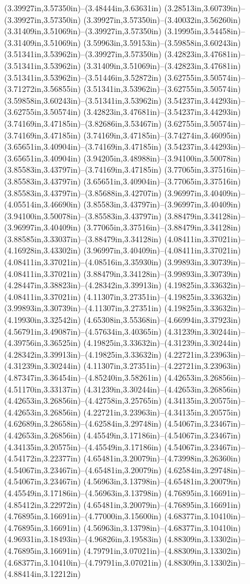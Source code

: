 (3.39927in,3.57350in)--(3.48444in,3.63631in) (3.28513in,3.60739in)--(3.39927in,3.57350in) (3.39927in,3.57350in)--(3.40032in,3.56260in) (3.31409in,3.51069in)--(3.39927in,3.57350in) (3.19995in,3.54458in)--(3.31409in,3.51069in) (3.59963in,3.59153in)--(3.59858in,3.60243in) (3.51341in,3.53962in)--(3.39927in,3.57350in) (3.42823in,3.47681in)--(3.51341in,3.53962in) (3.31409in,3.51069in)--(3.42823in,3.47681in) (3.51341in,3.53962in)--(3.51446in,3.52872in) (3.62755in,3.50574in)--(3.71272in,3.56855in) (3.51341in,3.53962in)--(3.62755in,3.50574in) (3.59858in,3.60243in)--(3.51341in,3.53962in) (3.54237in,3.44293in)--(3.62755in,3.50574in) (3.42823in,3.47681in)--(3.54237in,3.44293in) (3.74169in,3.47185in)--(3.82686in,3.53467in) (3.62755in,3.50574in)--(3.74169in,3.47185in) (3.74169in,3.47185in)--(3.74274in,3.46095in) (3.65651in,3.40904in)--(3.74169in,3.47185in) (3.54237in,3.44293in)--(3.65651in,3.40904in) (3.94205in,3.48988in)--(3.94100in,3.50078in) (3.85583in,3.43797in)--(3.74169in,3.47185in) (3.77065in,3.37516in)--(3.85583in,3.43797in) (3.65651in,3.40904in)--(3.77065in,3.37516in) (3.85583in,3.43797in)--(3.85688in,3.42707in) (3.96997in,3.40409in)--(4.05514in,3.46690in) (3.85583in,3.43797in)--(3.96997in,3.40409in) (3.94100in,3.50078in)--(3.85583in,3.43797in) (3.88479in,3.34128in)--(3.96997in,3.40409in) (3.77065in,3.37516in)--(3.88479in,3.34128in) (3.88585in,3.33037in)--(3.88479in,3.34128in) (4.08411in,3.37021in)--(4.16928in,3.43302in) (3.96997in,3.40409in)--(4.08411in,3.37021in) (4.08411in,3.37021in)--(4.08516in,3.35930in) (3.99893in,3.30739in)--(4.08411in,3.37021in) (3.88479in,3.34128in)--(3.99893in,3.30739in) (4.28447in,3.38823in)--(4.28342in,3.39913in) (4.19825in,3.33632in)--(4.08411in,3.37021in) (4.11307in,3.27351in)--(4.19825in,3.33632in) (3.99893in,3.30739in)--(4.11307in,3.27351in) (4.19825in,3.33632in)--(4.19930in,3.32542in) (4.65308in,3.55368in)--(4.66994in,3.37923in) (4.56791in,3.49087in)--(4.57634in,3.40365in) (4.31239in,3.30244in)--(4.39756in,3.36525in) (4.19825in,3.33632in)--(4.31239in,3.30244in) (4.28342in,3.39913in)--(4.19825in,3.33632in) (4.22721in,3.23963in)--(4.31239in,3.30244in) (4.11307in,3.27351in)--(4.22721in,3.23963in) (4.87347in,3.36454in)--(4.85240in,3.58261in) (4.42653in,3.26856in)--(4.51170in,3.33137in) (4.31239in,3.30244in)--(4.42653in,3.26856in) (4.42653in,3.26856in)--(4.42758in,3.25765in) (4.34135in,3.20575in)--(4.42653in,3.26856in) (4.22721in,3.23963in)--(4.34135in,3.20575in) (4.62689in,3.28658in)--(4.62584in,3.29748in) (4.54067in,3.23467in)--(4.42653in,3.26856in) (4.45549in,3.17186in)--(4.54067in,3.23467in) (4.34135in,3.20575in)--(4.45549in,3.17186in) (4.54067in,3.23467in)--(4.54172in,3.22377in) (4.65481in,3.20079in)--(4.73998in,3.26360in) (4.54067in,3.23467in)--(4.65481in,3.20079in) (4.62584in,3.29748in)--(4.54067in,3.23467in) (4.56963in,3.13798in)--(4.65481in,3.20079in) (4.45549in,3.17186in)--(4.56963in,3.13798in) (4.76895in,3.16691in)--(4.85412in,3.22972in) (4.65481in,3.20079in)--(4.76895in,3.16691in) (4.76895in,3.16691in)--(4.77000in,3.15600in) (4.68377in,3.10410in)--(4.76895in,3.16691in) (4.56963in,3.13798in)--(4.68377in,3.10410in) (4.96931in,3.18493in)--(4.96826in,3.19583in) (4.88309in,3.13302in)--(4.76895in,3.16691in) (4.79791in,3.07021in)--(4.88309in,3.13302in) (4.68377in,3.10410in)--(4.79791in,3.07021in) (4.88309in,3.13302in)--(4.88414in,3.12212in) 